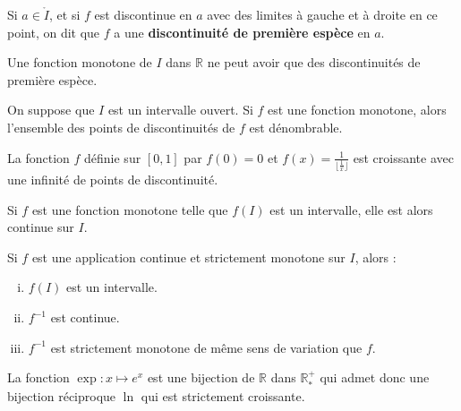 
	\begin{definition}
		Si $a \in \mathring{I}$, et si $f$ est discontinue en $a$ avec des limites à gauche et à droite en ce point, on dit que $f$ a une \textbf{discontinuité de première espèce} en $a$.
	\end{definition}

	\begin{proposition}
		Une fonction monotone de $I$ dans $\mathbb{R}$ ne peut avoir que des discontinuités de première espèce.
	\end{proposition}

	\begin{theorem}
		On suppose que $I$ est un intervalle ouvert. Si $f$ est une fonction monotone, alors l'ensemble des points de discontinuités de $f$ est dénombrable.
	\end{theorem}

	\begin{example}
		La fonction $f$ définie sur $[0,1]$ par $f(0) = 0$ et $f(x) = \frac{1}{\lfloor \frac{1}{x} \rfloor}$ est croissante avec une infinité de points de discontinuité.
	\end{example}


	\begin{proposition}
		Si $f$ est une fonction monotone telle que $f(I)$ est un intervalle, elle est alors continue sur $I$.
	\end{proposition}

	\begin{theorem}[Bijection]
		Si $f$ est une application continue et strictement monotone sur $I$, alors :
		\begin{enumerate}[(i)]
			\item $f(I)$ est un intervalle.
			\item $f^{-1}$ est continue.
			\item $f^{-1}$ est strictement monotone de même sens de variation que $f$.
		\end{enumerate}
	\end{theorem}

	\begin{example}
		La fonction $\exp : x \mapsto e^x$ est une bijection de $\mathbb{R}$ dans $\mathbb{R}^{+}_{*}$ qui admet donc une bijection réciproque $\ln$ qui est strictement croissante.
	\end{example}


